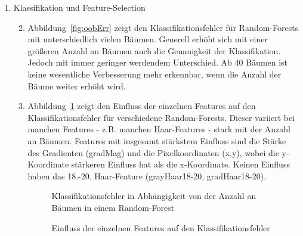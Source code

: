 \documentclass[]{report}
\newlength\figureheight
\newlength\figurewidth
\begin{document}
\begin{enumerate}
			
		\item Klassifikation und Feature-Selection
			\begin{enumerate}
				\setcounter{enumii}{1}
				\item Abbildung~\ref{fig:oobErr} zeigt den Klassifikationsfehler für Random-Forests mit unterschiedlich vielen Bäumen. Generell erhöht sich mit einer größeren Anzahl an Bäumen auch die Genauigkeit der Klassifikation. Jedoch mit immer geringer werdendem Unterschied. Ab 40 Bäumen ist keine wesentliche Verbesserung mehr erkennbar, wenn die Anzahl der Bäume weiter erhöht wird.
				\item Abbildung~\ref{fig:oobVar} zeigt den Einfluss der einzelnen Features auf den Klassifikationsfehler für verschiedene Random-Forests. Dieser variiert bei manchen Features - z.B. manchen Haar-Features - stark mit der Anzahl an Bäumen. Features mit insgesamt stärkstem Einfluss sind die Stärke des Gradienten (gradMag) und die Pixelkoordinaten (x,y), wobei die y-Koordinate stärkeren Einfluss hat als die x-Koordinate. Keinen Einfluss haben das 18.-20. Haar-Feature (grayHaar18-20, gradHaar18-20).
			\setlength\figureheight{3.5cm}
			\setlength{}
				\begin{figure}
					\centering
					
					\caption{Klassifikationsfehler in Abhängigkeit von der Anzahl an Bäumen in einem Random-Forest}
					\label{fig:oobErr}
					\caption{Einfluss der einzelnen Features auf den Klassifikationsfehler}
					\label{fig:oobVar}
				\end{figure}
			\end{enumerate}
			

\end{enumerate}
\end{document}
